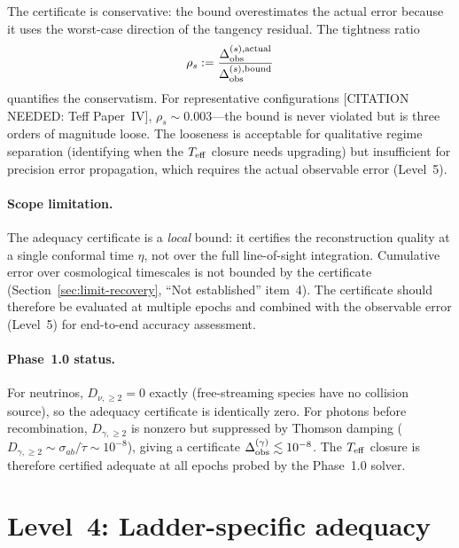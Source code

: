 The certificate is conservative: the bound overestimates
the actual error because it uses the worst-case direction
of the tangency residual.  The tightness ratio
\begin{equation}\label{eq:tightness}
\rho_s
:= \frac{\Delta_{\rm obs}^{(s),\text{actual}}}
        {\Delta_{\rm obs}^{(s),\text{bound}}}
\end{equation}
quantifies the conservatism.  For representative
configurations [CITATION NEEDED: Teff Paper~IV],
$\rho_s \sim 0.003$---the bound is never violated but is
three orders of magnitude loose.  The looseness is
acceptable for qualitative regime separation (identifying
when the $T_{\mathrm{eff}}$ closure needs upgrading) but
insufficient for precision error propagation, which
requires the actual observable error (Level~5).


\paragraph{Scope limitation.}

The adequacy certificate is a \emph{local} bound: it
certifies the reconstruction quality at a single
conformal time $\eta$, not over the full line-of-sight
integration.  Cumulative error over cosmological
timescales is not bounded by the certificate
(Section~\ref{sec:limit-recovery}, ``Not established''
item~4).  The certificate should therefore be evaluated
at multiple epochs and combined with the observable error
(Level~5) for end-to-end accuracy assessment.


\paragraph{Phase~1.0 status.}

For neutrinos, $D_{\nu,\geq 2} = 0$ exactly
(free-streaming species have no collision source), so the
adequacy certificate is identically zero.  For photons
before recombination, $D_{\gamma,\geq 2}$ is nonzero but
suppressed by Thomson damping ($D_{\gamma,\geq 2} \sim
\sigma_{ab}/\dot{\tau} \sim 10^{-8}$), giving a certificate
$\Delta_{\rm obs}^{(\gamma)} \lesssim 10^{-8}$.  The
$T_{\mathrm{eff}}$ closure is therefore certified adequate at all
epochs probed by the Phase~1.0 solver.


\section{Level~4: Ladder-specific adequacy}
\label{sec:err-ladder}

